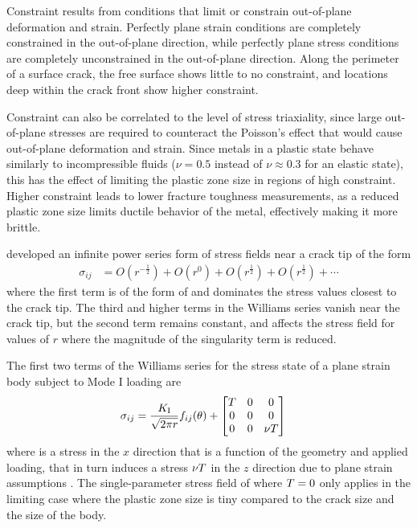 Constraint results from conditions that limit or constrain out-of-plane deformation and strain.
Perfectly plane strain conditions are completely constrained in the out-of-plane direction, while perfectly plane stress conditions are completely unconstrained in the out-of-plane direction.
Along the perimeter of a surface crack, the free surface shows little to no constraint, and locations deep within the crack front show higher constraint.

Constraint can also be correlated to the level of stress triaxiality, since large out-of-plane stresses are required to counteract the Poisson's effect that would cause out-of-plane deformation and strain.
Since metals in a plastic state behave similarly to incompressible fluids (\(\nu = 0.5\) instead of \(\nu \approx 0.3\) for an elastic state), this has the effect of limiting the plastic zone size in regions of high constraint.
Higher constraint leads to lower fracture toughness measurements, as a reduced plastic zone size limits ductile behavior of the metal, effectively making it more brittle.

\citet{williams1957} developed an infinite power series form of stress fields near a crack tip of the form
\begin{align}
\sigma_{ij} &= O(r^{-\frac{1}{2}}) + O(r^0) + O(r^{\frac{1}{2}}) + O(r^{\frac{1}{2}}) + \cdots
\end{align}
where the first term is of the form of  and dominates the stress values closest to the crack tip.
The third and higher terms in the Williams series vanish near the crack tip, but the second term remains constant, and affects the stress field for values of \(r\) where the magnitude of the singularity term is reduced.

The first two terms of the Williams series for the stress state of a plane strain body subject to Mode I loading are
\begin{align}
\sigma_{ij} &= \frac{K_\textnormal{I}}{\sqrt{2\pi r}} f_{ij}(\theta) +
\begin{bmatrix}
T & 0 & 0 \\
0 & 0 & 0 \\
0 & 0 & \nu T
\end{bmatrix}
\label{eq:t-stress}
\end{align}
where \T is a stress in the \(x\) direction that is a function of the geometry and applied loading, that in turn induces a stress \(\nu T\) in the \(z\) direction due to plane strain assumptions \citep{anderson2005}.
The single-parameter stress field of  where \(T = 0\) only applies in the limiting case where the plastic zone size is tiny compared to the crack size and the size of the body.

